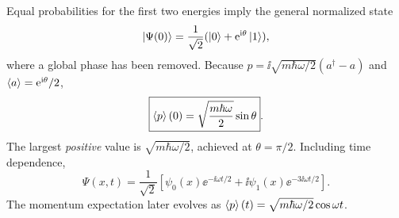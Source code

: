 Equal probabilities for the first two energies imply
the general normalized state
\begin{equation}
\left|\Psi(0)\right\rangle=\frac1{\sqrt2}
(\left|0\right\rangle+\mathrm{e}^{\mathrm{i}\theta}\left|1\right\rangle),
\end{equation}
where a global phase has been removed.
Because $p=\ii\sqrt{m\hbar\omega/2}(a^\dagger-a)$
and $\left\langle a\right\rangle=\mathrm{e}^{\mathrm{i}\theta}/2$,
\begin{equation}
\boxed{\left\langle p\right\rangle(0)=
\sqrt{\frac{m\hbar\omega}{2}}\sin\theta}.
\end{equation}
The largest \emph{positive} value is
$\boxed{\sqrt{m\hbar\omega/2}}$,
achieved at $\theta=\pi/2$.
Including time dependence,
\begin{equation}
\boxed{\Psi(x,t)=\frac1{\sqrt2}
\left[\psi_0(x)\ee^{-\ii\omega t/2}+
\ii\psi_1(x)\ee^{-3\ii\omega t/2}\right]}.
\end{equation}
The momentum expectation later evolves
as $\left\langle p\right\rangle(t)=\sqrt{m\hbar\omega/2}\cos\omega t$.

